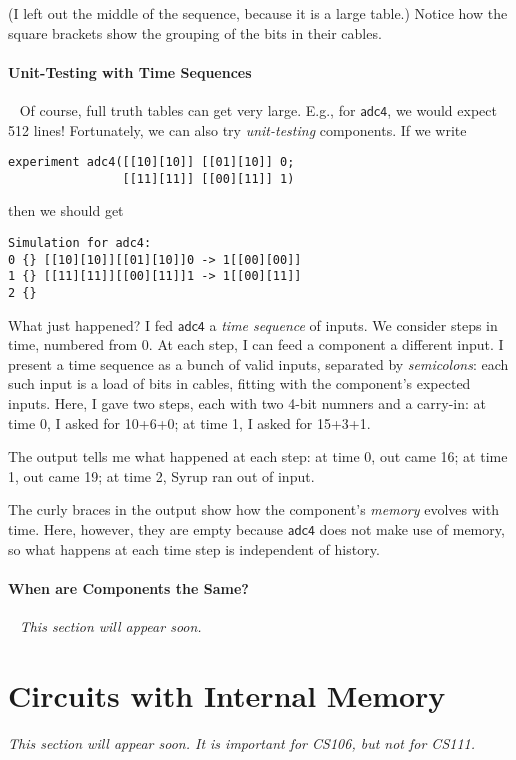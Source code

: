 \documentclass{article}
\newcommand{\C}{\mathsf}
\begin{document}
(I left out the middle of the sequence, because it is a large table.)
Notice how the square brackets show the grouping of the bits in their
cables.

\paragraph{Unit-Testing with Time Sequences}~
Of course, full truth tables can get very large. E.g., for $\C{adc4}$,
we would expect 512 lines! Fortunately, we can also try
\emph{unit-testing} components. If we write
\begin{verbatim}
experiment adc4([[10][10]] [[01][10]] 0;
                [[11][11]] [[00][11]] 1)
\end{verbatim}
then we should get
\begin{verbatim}
Simulation for adc4:
0 {} [[10][10]][[01][10]]0 -> 1[[00][00]]
1 {} [[11][11]][[00][11]]1 -> 1[[00][11]]
2 {}
\end{verbatim}

What just happened? I fed $\C{adc4}$ a \emph{time sequence} of inputs.
We consider steps in time, numbered from 0. At each step, I can feed
a component a different input.  I present a time
sequence as a bunch of valid inputs, separated by \emph{semicolons}:
each such input is a load of bits in cables, fitting with the
component's expected inputs. Here, I gave two steps, each with two
4-bit numners and a carry-in: at time 0, I
asked for 10+6+0; at time 1, I asked for 15+3+1.

The output tells me what happened at each step: at time 0, out came
16; at time 1, out came 19; at time 2, Syrup ran out of input.

The curly braces in the output show how the component's \emph{memory}
evolves with time. Here, however, they are empty because $\C{adc4}$
does not make use of memory, so what happens at each time step is
independent of history.


\paragraph{When are Components the Same?}~
\emph{This section will appear soon.}


\section{Circuits with Internal Memory}

\emph{This section will appear soon. It is important for CS106, but
  not for CS111.}
\end{document}

